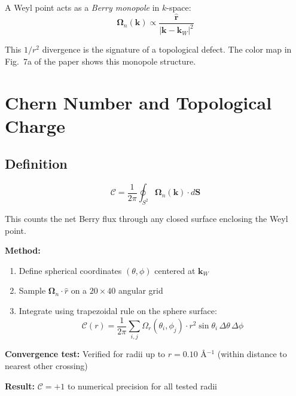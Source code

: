 \documentclass[11pt,letterpaper]{article}
\begin{document}
\begin{keyresult}[title={Monopole Structure}]
A Weyl point acts as a \emph{Berry monopole} in $k$-space:
\begin{equation}
\bm{\Omega}_n(\bm{k}) \propto \frac{\hat{\bm{r}}}{|\bm{k} - \bm{k}_W|^2}
\end{equation}

This $1/r^2$ divergence is the signature of a topological defect. The color map in Fig.~7a of the paper shows this monopole structure.
\end{keyresult}

\section{Chern Number and Topological Charge}

\subsection{Definition}

\begin{equation}
\boxed{
\mathcal{C} = \frac{1}{2\pi} \oint_{S^2} \bm{\Omega}_n(\bm{k}) \cdot d\bm{S}
}
\end{equation}

This counts the net Berry flux through any closed surface enclosing the Weyl point.

\begin{derivation}[title={Numerical Integration}]
\textbf{Method:}
\begin{enumerate}
    \item Define spherical coordinates $(\theta, \phi)$ centered at $\bm{k}_W$
    \item Sample $\bm{\Omega}_n \cdot \hat{r}$ on a $20 \times 40$ angular grid
    \item Integrate using trapezoidal rule on the sphere surface:
    \begin{equation}
    \mathcal{C}(r) = \frac{1}{2\pi} \sum_{i,j} \Omega_r(\theta_i, \phi_j) \cdot r^2 \sin\theta_i \, \Delta\theta \, \Delta\phi
    \end{equation}
\end{enumerate}

\textbf{Convergence test:} Verified for radii up to $r = 0.10$ \AA$^{-1}$ (within distance to nearest other crossing)

\textbf{Result:} $\mathcal{C} = +1$ to numerical precision for all tested radii
\end{derivation}
\end{document}
